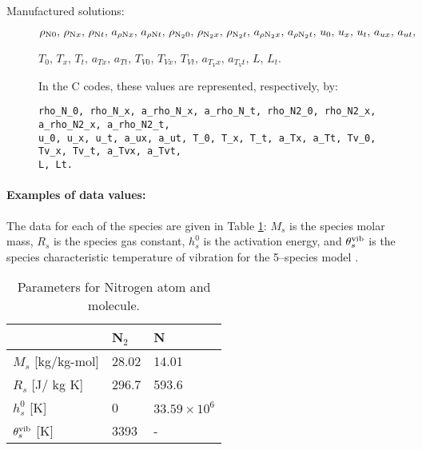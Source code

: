 \begin{description}
\item[Manufactured solutions:] $\rho_{\text{N} 0} , \,  \rho_{\text{N} x} , \,  \rho_{\text{N} t} ,\,  a_{  \rho \text{N} x } , \,  a_{  \rho \text{N} t } ,\,  \rho_{\text{N}_2 0} , \, \rho_{\text{N}_2 x} , \, \rho_{\text{N}_2 t} ,\,  a_{ \rho \text{N}_2 x } , \,  a_{ \rho \text{N}_2 t } ,\,  u_{0} , \, u_{x}  , \, u_{t}  ,\, a_{u x}  , \, a_{u t}  , $

$ T_{0} , \, T_{x} , \, T_{t} ,\,  a_{T x} , \,  a_{T t} ,\,  T_{V0} , \, T_{Vx}  ,  \, T_{Vt}  ,\,  a_{T_V x} , \,  a_{T_V t} ,\, L,\, L_t $.

\vspace{10pt}
In the C codes, these values are represented, respectively, by:
\vspace{-5pt}
\begin{verbatim} 
rho_N_0, rho_N_x, a_rho_N_x, a_rho_N_t, rho_N2_0, rho_N2_x, a_rho_N2_x, a_rho_N2_t, 
u_0, u_x, u_t, a_ux, a_ut, T_0, T_x, T_t, a_Tx, a_Tt, Tv_0, Tv_x, Tv_t, a_Tvx, a_Tvt, 
L, Lt.
\end{verbatim}
\end{description}


\paragraph{Examples of data values:}
The data for each of the species are given in Table \ref{table01}: $M_s$ is the species molar mass,   $R_s$ is the species gas constant, $h^0_s$ is the activation energy, and $\theta^{\text{vib}}_{s}$ is the species characteristic temperature of vibration for the 5--species model \citep{Kessler2004}.
\begin{table}[htb]
\caption{Parameters for Nitrogen atom and molecule.}
\centering
\begin{tabular}{l l l}
\hline\hline
 &     N$_2$     &  N  \\ [0.25ex]
\hline 
$M_s$ [kg/kg-mol]  & 28.02     &14.01               \vspace{2pt} \\
$R_s$ [J/ kg K]    & 296.7    &593.6               \vspace{2pt}\\
$h^0_s$ [K]        & 0        &$33.59\times 10^6$  \vspace{2pt}\\
$\theta^{\text{vib}}_{s}$ [K] & 3393     &-                    \vspace{2pt}\\
\hline
\end{tabular}
\label{table01}
\end{table}



